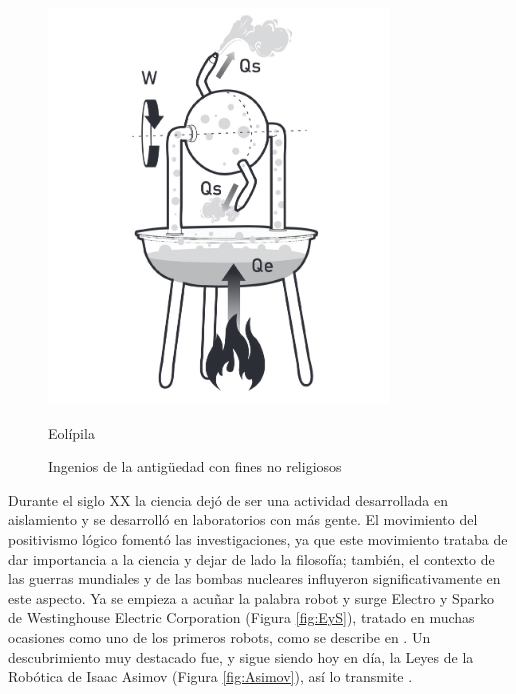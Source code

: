 \begin{figure}[ht!]
\begin{minipage}{0.3\linewidth}
		\includegraphics[width=\linewidth]{figs/eolipila.png}
		\caption*{\centering Eolípila} %
	\end{minipage}
	\caption{Ingenios de la antigüedad con fines no religiosos}
    \label{fig:ancient}
    \end{figure}

Durante el siglo XX la ciencia dejó de ser una actividad desarrollada en aislamiento y se desarrolló en laboratorios con más gente. El movimiento del positivismo lógico fomentó las investigaciones, ya que este movimiento trataba de dar importancia a la ciencia y dejar de lado la filosofía; también, el contexto de las guerras mundiales y de las bombas nucleares influyeron significativamente en este aspecto. Ya se empieza a acuñar la palabra robot y surge Electro y Sparko de Westinghouse Electric Corporation (Figura \ref{fig:EyS}), tratado en muchas ocasiones como uno de los primeros robots, como se describe en \cite{bidaudrobots}. Un descubrimiento muy destacado fue, y sigue siendo hoy en día, la Leyes de la Robótica de Isaac Asimov (Figura \ref{fig:Asimov}), así lo transmite \cite{barcelo2004nuevo}.\\


